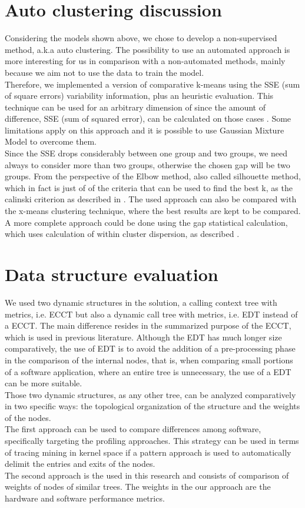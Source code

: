 \section{Auto clustering discussion}
Considering the models shown above, we chose to develop a non-supervised method, a.k.a auto clustering. The possibility to use an automated approach is more interesting for us in comparison with a non-automated methods, mainly because we aim not to use the data to train the model. \\
Therefore, we implemented a version of comparative k-means using the SSE (sum of square errors) variability information, plus an heuristic evaluation. This technique can be used for an arbitrary dimension of since the amount of difference, SSE (sum of squared error), can be calculated on those cases \cite{}.  Some limitations apply on this approach and it is possible to use Gaussian Mixture Model to overcome them.\\
Since the SSE drops considerably between one group and two groups, we need always to consider more than two groups, otherwise the chosen gap will be two groups.
From the perspective of the Elbow method, also called silhouette method, which in fact is just of of the criteria that can be used to find the best k, as the calinski criterion as described in \cite{calinski}. The used approach can also be compared with the x-means clustering technique, where the best results are kept to be compared.
A more complete approach could be done using the gap statistical calculation, which uses calculation of within cluster dispersion, as described \cite{gap_statistical}.
\section{Data structure evaluation}
We used two dynamic structures in the solution, a calling context tree with metrics, i.e. ECCT but also a dynamic call tree with metrics, i.e. EDT instead of a ECCT. 
The main difference resides in the summarized purpose of the ECCT, which is used in previous literature. Although the EDT has much longer size comparatively, the use of EDT is to avoid the addition of a pre-processing phase in the comparison of the internal nodes, that is, when comparing small portions of a software application, where an entire tree is unnecessary, the use of a EDT can be more suitable.\\
Those two dynamic structures, as any other tree, can be analyzed comparatively in two specific ways: the topological organization of the structure and the weights of the nodes. \\
The first approach can be used to compare differences among software, specifically targeting the profiling approaches. This strategy can be used in terms of tracing mining in kernel space if a pattern approach is used to automatically delimit the entries and exits of the nodes.\\
The second approach is the used in this research and consists of comparison of weights of nodes of similar trees. The weights in the our approach are the hardware and software performance metrics.
